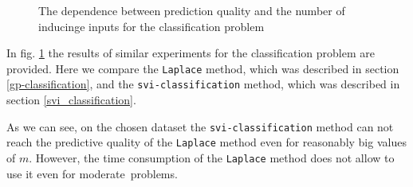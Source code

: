 \begin{figure}[!t]
	\centering
	\subfloat{
		\scalebox{0.8}{
			
		}
	}
	\subfloat{
		\scalebox{0.8}{
			
		}
	}
	\caption{The dependence between prediction quality and the number of inducinge inputs for the classification problem}
	\label{ind_inputs_class_results}
\end{figure}

In fig. \ref{ind_inputs_class_results} the results of similar experiments for the classification problem are provided. Here we compare the \lstinline{Laplace} method, which was described in section \ref{gp-classification}, and the \lstinline{svi-classification} method, which was described in section \ref{svi_classification}.

As we can see, on the chosen dataset the \lstinline{svi-classification} method can not reach the predictive quality of the \lstinline{Laplace} method even for reasonably big values of $m$. However, the time consumption of the \lstinline{Laplace} method does not allow to use it even for moderate~problems. 



